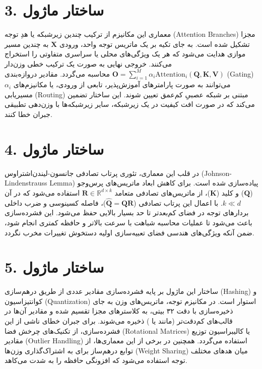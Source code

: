 \documentclass[12pt,a4paper]{report}
\begin{document}
\section*{3. ساختار ماژول }
معماری این مکانیزم از ترکیب چندین زیرشبکه یا هدِ توجه (Attention Branches) مجزا تشکیل شده است. به جای تکیه بر یک ماتریس توجه واحد، ورودی $\mathbf{X}$ به چندین مسیر موازی هدایت می‌شود که هر یک ویژگی‌های محلی یا سراسری متفاوتی را استخراج می‌کنند. خروجی نهایی به صورت یک ترکیب خطی وزن‌دار $\mathbf{O} = \sum_{i=1}^{M} \alpha_i \mathrm{Attention}_i(\mathbf{Q}, \mathbf{K}, \mathbf{V})$ محاسبه می‌گردد. مقادیر دروازه‌بندی (Gating) $\alpha_i$ می‌توانند به صورت پارامترهای آموزش‌پذیر، تابعی از ورودی، یا مکانیزم‌های مسیریابی (Routing) مبتنی بر شبکه عصبیِ کم‌عمق تعیین شوند. این ساختار تضمین می‌کند که در صورت افت کیفیت در یک زیرشبکه، سایر زیرشبکه‌ها با وزن‌دهی تطبیقی جبران خطا کنند.

\section*{4. ساختار ماژول }
در قلب این معماری، تئوری پرتاب تصادفی جانسون-لیندن‌اشتراوس (Johnson-Lindenstrauss Lemma) پیاده‌سازی شده است. برای کاهش ابعاد ماتریس‌های پرس‌وجو ($\mathbf{Q}$) و کلید ($\mathbf{K}$)، از ماتریس‌های تصادفی متعامد $\mathbf{R} \in \mathbb{R}^{d \times k}$ استفاده می‌شود که در آن $k \ll d$. با اعمال این پرتاب تصادفی ($\hat{\mathbf{Q}} = \mathbf{Q} \mathbf{R}$)، فاصله کسینوسی و ضرب داخلی بردارهای توجه در فضای کم‌بعدتر تا حد بسیار بالایی حفظ می‌شود. این فشرده‌سازی باعث می‌شود تا عملیات محاسبه شباهت با سرعت بالاتر و حافظه کمتری انجام شود، ضمن آنکه ویژگی‌های هندسی فضای تعبیه‌سازی اولیه دستخوش تغییرات مخرب نگردد.

\section*{5. ساختار ماژول }
ساختار این ماژول بر پایه فشرده‌سازی مقادیر عددی از طریق درهم‌سازی (Hashing) و کوانتیزاسیون (Quantization) استوار است. در مکانیزم توجه، ماتریس‌های وزن به جای ذخیره‌سازی با دقت ۳۲ بیتی، به کلاسترهای مجزا تقسیم شده و مقادیر آن‌ها در قالب‌های کم‌دقت‌تر (مانند  یا ) ذخیره می‌شوند. برای جبران خطای ناشی از این فشرده‌سازی، از تکنیک‌های چرخش فضا (Rotational Matrices) یا کالیبراسیون توزیع مقادیر (Outlier Handling) استفاده می‌گردد. همچنین در برخی از این معماری‌ها، از توابع درهم‌ساز برای به اشتراک‌گذاری وزن‌ها (Weight Sharing) میان هد‌های مختلف توجه استفاده می‌شود که افزونگی حافظه را به شدت می‌کاهد.
\end{document}
